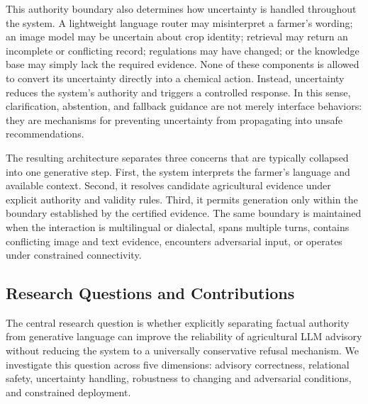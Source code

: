 \documentclass[a4paper,fleqn]{cas-dc}
\begin{document}
This authority boundary also determines how uncertainty is handled throughout the system. A lightweight language router may misinterpret a farmer's wording; an image model may be uncertain about crop identity; retrieval may return an incomplete or conflicting record; regulations may have changed; or the knowledge base may simply lack the required evidence. None of these components is allowed to convert its uncertainty directly into a chemical action. Instead, uncertainty reduces the system's authority and triggers a controlled response. In this sense, clarification, abstention, and fallback guidance are not merely interface behaviors: they are mechanisms for preventing uncertainty from propagating into unsafe recommendations.

The resulting architecture separates three concerns that are typically collapsed into one generative step. First, the system interprets the farmer's language and available context. Second, it resolves candidate agricultural evidence under explicit authority and validity rules. Third, it permits generation only within the boundary established by the certified evidence. The same boundary is maintained when the interaction is multilingual or dialectal, spans multiple turns, contains conflicting image and text evidence, encounters adversarial input, or operates under constrained connectivity.

\subsection{Research Questions and Contributions}
The central research question is whether explicitly separating factual authority from generative language can improve the reliability of agricultural LLM advisory without reducing the system to a universally conservative refusal mechanism. We investigate this question across five dimensions: advisory correctness, relational safety, uncertainty handling, robustness to changing and adversarial conditions, and constrained deployment.
\end{document}
